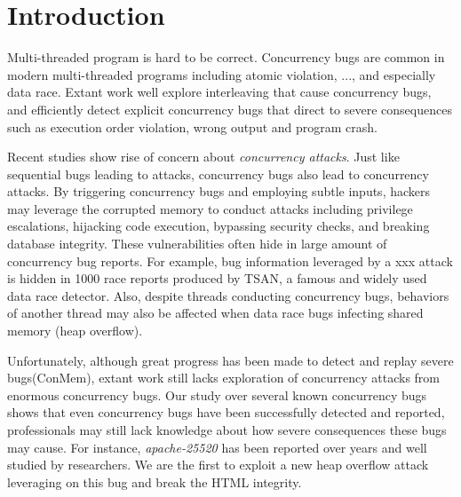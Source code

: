 \section{Introduction} \label{sec:intro}


Multi-threaded program is hard to be correct. 
Concurrency bugs are common in modern multi-threaded programs\cite{lu:concurrency-bugs,conmem:asplos10,conseq:asplos11, lu:muvi:sosp} 
including atomic violation, ..., and especially data race.
Extant work well explore interleaving that cause concurrency bugs, 
and efficiently detect explicit concurrency bugs that direct to  
severe consequences such as execution order violation, wrong output and program crash.

Recent studies\cite{acidrain:sigmod17,con:hotpar12} show rise of concern about \emph{concurrency attacks}.
Just like sequential bugs leading to attacks, concurrency bugs also lead to concurrency attacks. 
By triggering concurrency bugs and employing subtle inputs, 
hackers may leverage the corrupted memory to conduct  
attacks including privilege escalations\cite{}, hijacking code execution\cite{}, bypassing security checks\cite{}, 
and breaking database integrity\cite{acidrain:sigmod17}.
These vulnerabilities often hide in large amount of concurrency bug reports. 
For example, bug information leveraged by a xxx attack is hidden in 1000 race reports 
produced by TSAN\cite{tsan}, a famous and widely used data race detector. 
Also, despite threads conducting concurrency bugs, 
behaviors of another thread may also be affected when data race bugs infecting shared memory (\eg heap overflow)\cite{apache-bug-25520,}. 


Unfortunately, although great progress has been made to detect and replay severe bugs(\eg ConMem\cite{conmem:asplos10}), 
extant work still lacks exploration of concurrency attacks from enormous concurrency bugs. Our study over several known concurrency 
bugs\cite{apache-bug-25520, apache-bug-46215} shows that even concurrency bugs have been successfully detected and reported, 
professionals may still lack knowledge about how severe consequences these bugs may cause. 
For instance, \emph{apache-25520}\cite{apache-bug-25520} has been 
reported over years and well studied by researchers\cite{lu:concurrency-bugs}.  
We are the first to exploit a new heap overflow attack leveraging on this bug and break the HTML integrity.  


